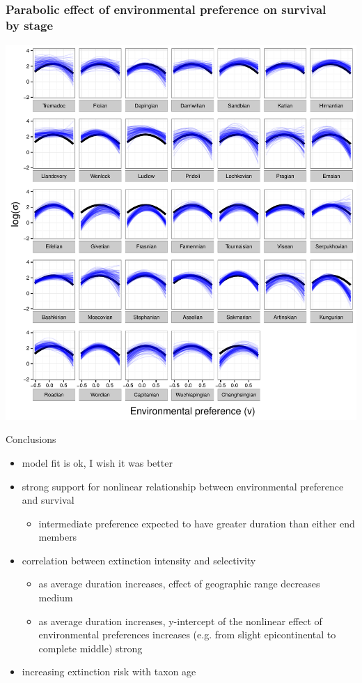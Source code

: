 \documentclass{beamer}
\begin{document}
\begin{frame}
  \frametitle{Parabolic effect of environmental preference on survival \\by stage}
  \begin{center}
    \includegraphics[width=\textwidth,height=0.8\textheight,keepaspectratio=true]{figure/env_cohort}
  \end{center}
\end{frame}

\begin{frame}
  \begin{alertblock}{Conclusions}
    \begin{itemize}
      \item model fit is ok, I wish it was better
      \item strong support for nonlinear relationship between environmental preference and survival
        \begin{itemize}
          \item intermediate preference expected to have greater duration than either end members
        \end{itemize}
      \item correlation between extinction intensity and selectivity
        \begin{itemize}
          \item as average duration increases, effect of geographic range decreases \alert{medium}
          \item as average duration increases, y-intercept of the nonlinear effect of environmental preferences increases (e.g. from slight epicontinental to complete middle) \alert{strong}
        \end{itemize}
      \item increasing extinction risk with taxon age
    \end{itemize}
  \end{alertblock}
\end{frame}
\end{document}
